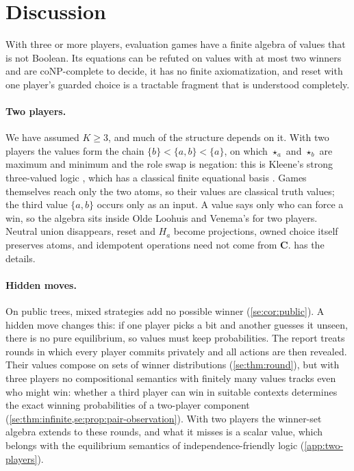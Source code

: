 \section{Discussion}\label{sec:discussion}\label{sec:verification}\label{sec:development}

With three or more players, evaluation games have a finite algebra of values that is not Boolean. Its equations can be refuted on values with at most two winners and are coNP-complete to decide, it has no finite axiomatization, and reset with one player's guarded choice is a tractable fragment that is understood completely.

\paragraph{Two players.}
We have assumed $K\geq3$, and much of the structure depends on it. With two players the values form the chain $\{b\}<\{a,b\}<\{a\}$, on which $\star_a$ and $\star_b$ are maximum and minimum and the role swap is negation: this is Kleene's strong three-valued logic \cite{Kleene1952}, which has a classical finite equational basis \cite{Kalman1958}. Games themselves reach only the two atoms, so their values are classical truth values; the third value $\{a,b\}$ occurs only as an input. A value says only who can force a win, so the algebra sits inside Olde Loohuis and Venema's for two players. Neutral union disappears, reset and $H_a$ become projections, owned choice itself preserves atoms, and idempotent operations need not come from $\mathbf C$.  has the details.

\paragraph{Hidden moves.}
On public trees, mixed strategies add no possible winner (\cref{se:cor:public}). A hidden move changes this: if one player picks a bit and another guesses it unseen, there is no pure equilibrium, so values must keep probabilities. The report treats rounds in which every player commits privately and all actions are then revealed. Their values compose on sets of winner distributions (\cref{se:thm:round}), but with three players no compositional semantics with finitely many values tracks even who might win: whether a third player can win in suitable contexts determines the exact winning probabilities of a two-player component (\cref{se:thm:infinite,se:prop:pair-observation}). With two players the winner-set algebra extends to these rounds, and what it misses is a scalar value, which belongs with the equilibrium semantics of independence-friendly logic \cite{SevensterSandu2010} (\cref{app:two-players}).

